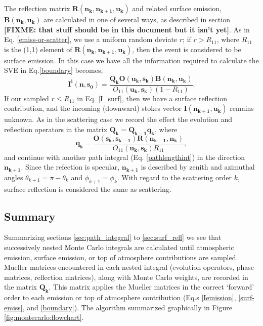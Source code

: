 The reflection matrix $\mathbf{R(n_k,n_{k+1},u_k)}$ and related surface
emission, $\mathbf{B(n_k,u_k)}$ are calculated in one of several ways, as
described in section {\bf[FIXME: that stuff should be in this document but it
isn't yet]}.  As in Eq. \ref{emiss-or-scatter}, we use a uniform random deviate
$r$; if $r>R_{11}$, where $R_{11}$ is the (1,1) element of
$\mathbf{R(n_k,n_{k+1},u_k)}$, then the event is considered to be surface
emission.  In this case we have all the information required to calculate the
SVE in Eq.\ref{boundary} becomes,
\begin{equation}
\mathbf{I^i(n,s_0)}=\frac{\mathbf{Q_k}\mathbf{O(u_k,s_k)B(n_k,u_k)}}
{O_{11}(\mathbf{u_{k},s_k})(1-R_{11})}.
\label{surf-emiss}
\end{equation}
If our sampled $r \le R_{11}$ in Eq. \ref{I_surf}, then we have a surface
reflection contribution, and the incoming (downward) stokes vector
$\mathbf{I(n_{k+1},u_k)}$ remains unknown.  As in the scattering case we record
the effect the evolution and reflection operators in the matrix
$\mathbf{Q_k}=\mathbf{Q_{k-1}q_k}$, where
\begin{equation}
\mathbf{q_k}=\frac{\mathbf{O(s_k,s_{k-1})}\mathbf{R(n_{k-1},n_k)}}
  {O_{11}(\mathbf{u_{k},s_k})R_{11}},
\end{equation}
and continue with another path integral (Eq. \ref{pathlengthint}) in the
direction $\mathbf{n_{k+1}}$.
Since the refection is specular, $\mathbf{n_{k+1}}$ is described by zenith and
azimuthal angles $\theta_{k+1}=\pi-\theta_k$ and $\phi_{k+1}=\phi_k$.  With
regard to the scattering order $k$, surface reflection is considered the same as
scattering.

\subsection{Summary}

Summarizing sections \ref{sec:path_integral} to \ref{sec:surf_refl} we see that
successively nested Monte Carlo integrals are calculated until atmospheric
emission, surface emission, or top of atmosphere contributions are sampled.
Mueller matrices encountered in each nested integral (evolution operators, phase
matrices, reflection matrices), along with Monte Carlo weights, are recorded in
the matrix $\mathbf{Q_k}$.  This matrix applies the Mueller matrices in the
correct `forward' order to each emission or top of atmosphere contribution (Eq.s
\ref{Iemission}, \ref{surf-emiss}, and \ref{boundary}).  The algorithm
summarized graphically in Figure \ref{fig:montecarlo:flowchart}.

